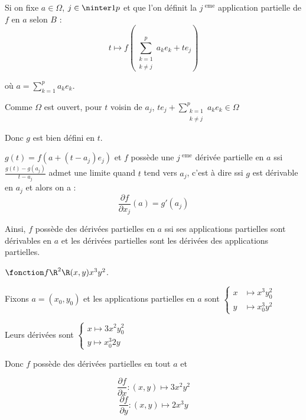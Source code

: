 \begin{remarque}
    Si on fixe $a \in \Omega$, $j \in \ninter 1 p$ et que l'on définit la $j^{\text{ eme}}$ 
    application partielle de $f$ en $a$ selon $B$ : 
    $$t \mapsto f\left(\sum_{\substack{k = 1 \\k \neq j}}^p a_ke_k + t e_j \right)$$

    où $a = \displaystyle \sum_{k = 1 }^{p }a_k e_k$. 

    Comme $\Omega$ est ouvert, pour $t$ voisin de $a_j$, $\displaystyle t e_j + \sum_{\substack{k = 1 \\ k \neq j}}^{p } a_k e_k \in \Omega$

    Donc $g$ est bien défini en $t$. 

    $g(t) = f(a + (t - a_j) e_j)$ et $f$ possède une $j^{\text{ eme}}$ dérivée partielle en $a$ 
    ssi $\frac{g(t) - g(a_j)} {t - a_j}$ admet une limite quand $t$ tend vers $a_j$, c'est à dire ssi $g$ est dérivable en $a_j$
    et alors on a :
    $$\frac{\partial f}{\partial x_j}(a) = g'(a_j)$$

    Ainsi, $f$ possède des dérivées partielles en $a$ ssi ses applications partielles sont dérivables
    en $a$ et les dérivées partielles sont les dérivées des applications partielles.
\end{remarque}

\begin{exemple}
    $\fonction f {\R^2}{\R}{(x, y)}{x^3 y^2}$. 

    Fixons $a = (x_0, y_0)$ et les applications partielles en $a$ sont 
    $\begin{cases}
        x & \mapsto x^3 y_0^2 \\
        y & \mapsto x_0^3 y^2
    \end{cases}$

    Leurs dérivées sont $\begin{cases}
        x \mapsto 3 x^2 y_0^2 \\
        y \mapsto x_0^3 2y
    \end{cases}$

    Donc $f$ possède des dérivées partielles en tout $a$ et 

    $$\frac{\partial f}{\partial x} : (x, y) \mapsto 3 x^2 y^2$$
    $$\frac{\partial f } {\partial y } : (x, y) \mapsto 2 x^3 y$$
\end{exemple}


